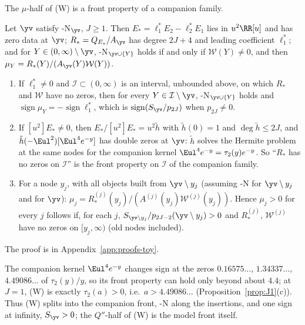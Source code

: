 The $\mu$-half of (W) is a front property of a companion family.

\begin{proposition}\label{prop:W-reduction}
Let $\yv$ satisfy \hyp{N}$_{\yv}$, $J\ge1$. Then $E_*=\ell_1^*E_2-\ell_2^*E_1$ lies in $u^2\RR[u]$ and has zero data at
$\yv$; $R_*=Q_{E_*}/A_{\yv}$ has degree $2J+4$ and leading coefficient $\ell_1^*$; and for $Y\in(0,\infty)\setminus\yv$,
\hyp{N}$_{\yv\cup\{Y\}}$ holds if and only if $\mathcal W(Y)\neq0$, and then $\mu_Y=R_*(Y)/(A_{\yv}(Y)\mathcal W(Y))$.
\begin{enumerate}[label=\textup{(\alph*)}]
\item If $\ell_1^*\neq0$ and $\mathcal I\subset(0,\infty)$ is an interval, unbounded above, on which $R_*$ and $\mathcal W$
have no zeros, then for every $Y\in\mathcal I\setminus\yv$, \hyp{N}$_{\yv\cup\{Y\}}$ holds and
$\operatorname{sign}\mu_Y=-\operatorname{sign}\ell_1^*$, which is $\operatorname{sign}(S_{\yv}/p_{2J})$ when $p_{2J}\neq0$.
\item If $[u^2]E_*\neq0$, then $E_*/[u^2]E_*=u^2\tilde h$ with $\tilde h(0)=1$ and $\deg\tilde h\le2J$, and
$\tilde h(-\Eul^2)[\Eul^4e^{-y}]$ has double zeros at $\yv$: $\tilde h$ solves the Hermite problem at the same nodes for
the companion kernel $\Eul^4e^{-y}=\tau_2(y)e^{-y}$. So ``$R_*$ has no zeros on $\mathcal I$'' is the front property on
$\mathcal I$ of the companion family.
\item For a node $y_j$, with all objects built from $\yv\setminus y_j$ \textup{(}assuming \hyp{N} for $\yv\setminus y_j$
and for $\yv$\textup{)}: $\mu_j=R_*^{(j)}(y_j)/(A^{(j)}(y_j)\mathcal W^{(j)}(y_j))$. Hence $\mu_j>0$ for every $j$
follows if, for each $j$, $S_{\yv\setminus y_j}/p_{2J-2}(\yv\setminus y_j)>0$ and $R_*^{(j)}$, $\mathcal W^{(j)}$ have no
zeros on $[y_j,\infty)$ \textup{(}old nodes included\textup{)}.
\end{enumerate}
\end{proposition}

The proof is in Appendix~\ref{app:proofs-toy}.

The companion kernel $\Eul^4e^{-y}$ changes sign at the zeros $0.16575\ldots$, $1.34337\ldots$, $4.49086\ldots$ of
$\tau_2(y)/y$, so its front property can hold only beyond about $4.4$; at $J=1$, (W) is exactly $\tau_2(a)>0$,
i.e.\ $a>4.49086\ldots$ (Proposition~\ref{prop:J1}(c)). Thus (W) splits into the companion front, \hyp{N} along the
insertions, and one sign at infinity, $S_{\yv}>0$; the $Q''$-half of (W) is the model front itself.
